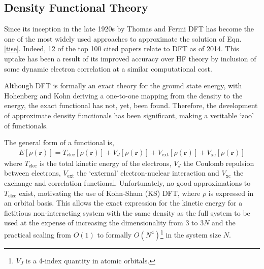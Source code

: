 \documentclass[main.tex]{subfiles}
\begin{document}
\subsection{Density Functional Theory}

Since its inception in the late 1920s by Thomas\cite{Thomas1927} and Fermi\cite{Fermi1928} DFT has become the one of the most widely used approaches to approximate the solution of Eqn. \eqref{tise}.\cite{Haunschild2019} Indeed, 12 of the top 100 cited papers relate to DFT as of 2014.\cite{VanNoorden2014} This uptake has been a result of its improved accuracy over HF theory by inclusion of some dynamic electron correlation at a similar computational cost.

Although DFT is formally an exact theory for the ground state energy, with Hohenberg and Kohn deriving a one-to-one mapping from the density to the energy,\cite{HohenbergKohn1964} the exact functional has not, yet, been found.\cite{Kanungo2019} Therefore, the development of approximate density functionals has been significant, making a veritable `zoo' of functionals.\cite{Mardirossian2017, Goerigk2017}

The general form of a functional is,
\begin{eqnarray}
E[\rho(\boldsymbol{r})] = T_\text{elec}[\rho(\boldsymbol{r})]  + V_{J}[\rho(\boldsymbol{r})] + V_\text{ext}[\rho(\boldsymbol{r})] + V_\text{xc}[\rho(\boldsymbol{r})] 
\end{eqnarray}
where $T_\text{elec}$ is the total kinetic energy of the electrons, $V_{J}$ the Coulomb repulsion between electrons, $V_\text{ext}$ the `external' electron-nuclear interaction and $V_\text{xc}$ the exchange and correlation functional. Unfortunately, no good approximations to $T_\text{elec}$ exist,\cite{OFDFT2009} motivating the use of Kohn-Sham (KS) DFT, where $\rho$ is expressed in an orbital basis.\cite{KS1965} This allows the exact expression for the kinetic energy for a fictitious non-interacting system with the same density as the full system to be used at the expense of increasing the dimensionality from 3 to 3$N$ and the practical scaling from $O(1)$ to formally $O(N^4)$\footnote{$V_J$ is a 4-index quantity in atomic orbitals.} in the system size $N$.\cite{Lignres2005}
\end{document}
